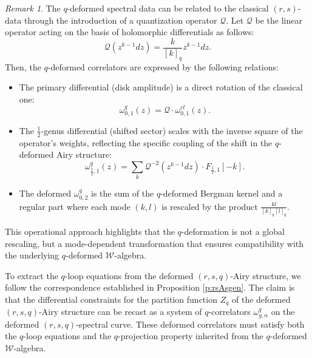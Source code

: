\documentclass[reqno,11pt]{amsart}
\theoremstyle{plain}
\theoremstyle{definition}
\theoremstyle{remark}
\newtheorem{remark}[theorem]{Remark}
\numberwithin{equation}{section}
\newcommand{\1}{\mathds{1}}
\newcommand{\2}{\frac{1}{2}}
\begin{document}
{								\begin{remark}
									The $q$-deformed spectral data can be  related to the classical $(r,s)$-data through the introduction of a quantization operator $\mathcal{Q}$. Let $\mathcal{Q}$ be the linear operator acting on the basis of holomorphic differentials as follows:
									\begin{equation}
										\mathcal{Q}(z^{k-1}dz) = \frac{k}{[k]_q} z^{k-1}dz.
									\end{equation}
									Then, the $q$-deformed correlators are expressed by the following relations:
									\begin{itemize}
										\item[(a)] The primary differential (disk amplitude) is a direct rotation of the classical one:
										\begin{equation}
											\omega^{q}_{0,1}(z)=\mathcal{Q} \cdot	\omega^{cl}_{0,1}(z).
										\end{equation}
										\item[(b)]  The $\frac{1}{2}$-genus differential (shifted sector) scales with the inverse square of the operator's weights, reflecting the specific coupling of the shift in the $q$-deformed Airy structure:
										\begin{equation}
											\omega^{q}_{\frac{1}{2},1}(z)=\sum_{k}\mathcal{Q}^{-2}(z^{k-1}dz)\cdot F_{\frac{1}{2},1}[-k].
										\end{equation}
										\item[(c)] The deformed $\omega^{q}_{0,2}$ is the sum of the $q$-deformed Bergman kernel and a regular part where each mode $(k,l)$ is rescaled by the product $\frac{k l}{[k]_q [l]_q}$.
									\end{itemize}
									This operational approach highlights that the $q$-deformation is not a global rescaling, but a mode-dependent transformation that ensures compatibility with the underlying $q$-deformed $\mathcal{W}$-algebra.
								\end{remark}
								
								To extract the $q$-loop equations from the deformed $(r,s,q)$-Airy structure, we follow the correspondence established in  Proposition \ref{p:rsAsgen}. The claim is that the differential constraints  for the partition function $Z_q$ of the deformed $(r,s,q)$-Airy structure can be recast as a system of $q$-correlators $
								\omega^q_{g,n}$ on the deformed $(r,s,q)$-spectral curve. These deformed correlators must satisfy both the $q$-loop equations and the $q$-projection property inherited from the $q$-deformed $\mathcal{W}$-algebra.
								
}
\end{document}
